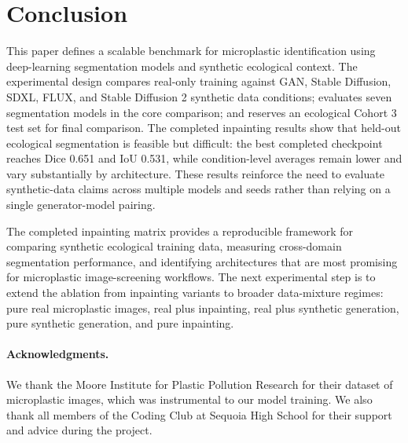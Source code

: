 \documentclass{article}
\begin{document}
\section{Conclusion}

This paper defines a scalable benchmark for microplastic identification using deep-learning segmentation models and synthetic ecological context. The experimental design compares real-only training against GAN, Stable Diffusion, SDXL, FLUX, and Stable Diffusion 2 synthetic data conditions; evaluates seven segmentation models in the core comparison; and reserves an ecological Cohort 3 test set for final comparison. The completed inpainting results show that held-out ecological segmentation is feasible but difficult: the best completed checkpoint reaches Dice 0.651 and IoU 0.531, while condition-level averages remain lower and vary substantially by architecture. These results reinforce the need to evaluate synthetic-data claims across multiple models and seeds rather than relying on a single generator-model pairing.

The completed inpainting matrix provides a reproducible framework for comparing synthetic ecological training data, measuring cross-domain segmentation performance, and identifying architectures that are most promising for microplastic image-screening workflows. The next experimental step is to extend the ablation from inpainting variants to broader data-mixture regimes: pure real microplastic images, real plus inpainting, real plus synthetic generation, pure synthetic generation, and pure inpainting.

\paragraph{Acknowledgments.}

We thank the Moore Institute for Plastic Pollution Research for their dataset of microplastic images, which was instrumental to our model training. We also thank all members of the Coding Club at Sequoia High School for their support and advice during the project.

\medskip
\end{document}
